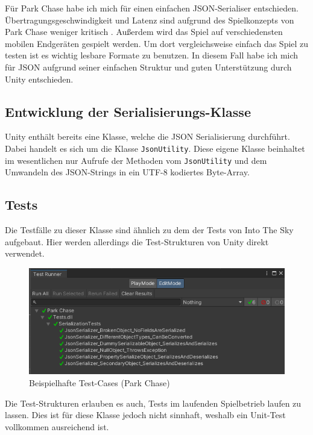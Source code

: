 Für Park Chase habe ich mich für einen einfachen JSON-Serialiser entschieden. Übertragungsgeschwindigkeit und Latenz
 sind aufgrund des Spielkonzepts von Park Chase weniger kritisch . Außerdem wird das Spiel auf verschiedensten mobilen Endgeräten gespielt werden. Um dort vergleichsweise einfach das Spiel zu testen ist es wichtig lesbare Formate zu benutzen. In diesem Fall habe ich mich für JSON aufgrund seiner einfachen Struktur und guten Unterstützung durch Unity entschieden.

\subsection{Entwicklung der Serialisierungs-Klasse}

Unity enthält bereits eine Klasse, welche die JSON Serialisierung durchführt. Dabei handelt es sich um die Klasse \verb|JsonUtility|. Diese eigene Klasse beinhaltet im wesentlichen nur Aufrufe der Methoden vom  \verb|JsonUtility| und dem Umwandeln des JSON-Strings in ein UTF-8 kodiertes Byte-Array.

\subsection{Tests}

Die Testfälle zu dieser Klasse sind ähnlich zu dem der Tests von Into The Sky aufgebaut. Hier werden allerdings die Test-Strukturen von Unity direkt verwendet. 

\begin{figure}[!h]
	\centering
	\includegraphics[width=16cm]{figures/parkchasetests.png}
	\caption{Beispielhafte Test-Cases (Park Chase)}
	\label{fig:parkchasetests}
\end{figure}

Die Test-Strukturen erlauben es auch, Tests im laufenden Spielbetrieb laufen zu lassen. Dies ist für diese Klasse jedoch nicht sinnhaft, weshalb ein Unit-Test vollkommen ausreichend ist.

\newpage

